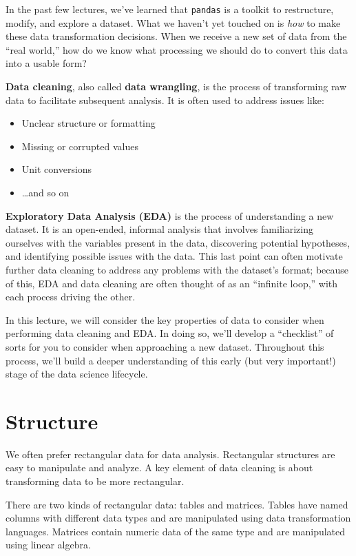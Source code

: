 \documentclass[
  letterpaper,
  DIV=11,
  numbers=noendperiod]{scrreprt}
\providecommand{\tightlist}{%
  \setlength{\itemsep}{0pt}\setlength{\parskip}{0pt}}\usepackage{longtable,booktabs,array}
\begin{document}
In the past few lectures, we've learned that \texttt{pandas} is a
toolkit to restructure, modify, and explore a dataset. What we haven't
yet touched on is \emph{how} to make these data transformation
decisions. When we receive a new set of data from the ``real world,''
how do we know what processing we should do to convert this data into a
usable form?

\textbf{Data cleaning}, also called \textbf{data wrangling}, is the
process of transforming raw data to facilitate subsequent analysis. It
is often used to address issues like:

\begin{itemize}
\tightlist
\item
  Unclear structure or formatting
\item
  Missing or corrupted values
\item
  Unit conversions
\item
  \ldots and so on
\end{itemize}

\textbf{Exploratory Data Analysis (EDA)} is the process of understanding
a new dataset. It is an open-ended, informal analysis that involves
familiarizing ourselves with the variables present in the data,
discovering potential hypotheses, and identifying possible issues with
the data. This last point can often motivate further data cleaning to
address any problems with the dataset's format; because of this, EDA and
data cleaning are often thought of as an ``infinite loop,'' with each
process driving the other.

In this lecture, we will consider the key properties of data to consider
when performing data cleaning and EDA. In doing so, we'll develop a
``checklist'' of sorts for you to consider when approaching a new
dataset. Throughout this process, we'll build a deeper understanding of
this early (but very important!) stage of the data science lifecycle.

\section{Structure}\label{structure}

We often prefer rectangular data for data analysis. Rectangular
structures are easy to manipulate and analyze. A key element of data
cleaning is about transforming data to be more rectangular.

There are two kinds of rectangular data: tables and matrices. Tables
have named columns with different data types and are manipulated using
data transformation languages. Matrices contain numeric data of the same
type and are manipulated using linear algebra.
\end{document}
